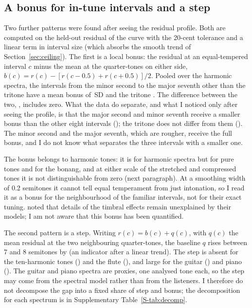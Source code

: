 \documentclass[11pt,a4paper]{article}
\newcommand{\SDu}{\,SD}
\begin{document}
\subsection{A bonus for in-tune intervals and a step}
\label{sec:bonusstep}
Two further patterns were found after seeing the residual profile. Both are computed on the
held-out residual of the curve with the 20-cent tolerance and a linear term in interval size
(which absorbs the smooth trend of Section~\ref{sec:ceiling}). The first is a local bonus: the
residual at an equal-tempered interval $c$ minus the mean at the quarter-tones on either side,
$b(c)=r(c)-[r(c-0.5)+r(c+0.5)]/2$. Pooled over the harmonic spectra, the intervals from the
minor second to the major seventh other than the tritone have a mean bonus of
\decTwoBonusOther\SDu{} and the tritone \decTwoBonusTT. The difference between the two,
\decTwoOtherMinusTT, includes zero. What the data do separate, and what I noticed only after
seeing the profile, is that the major second and minor seventh receive a smaller bonus than
the other eight intervals (\decTwoMMvsRest); the tritone does not differ from them
(\decTwoTTvsMM). The minor second and the major seventh, which are rougher, receive the
full bonus, and I do not know what separates the three intervals with a smaller one.

The bonus belongs to harmonic tones: it is \gbSharpHarmOther{} for harmonic spectra but
\gbSharpPure{} for pure tones and \gbSharpBonang{} for the bonang, and at either scale of the
stretched and compressed tones it is not distinguishable from zero (next paragraph). At a
smoothing width of 0.2 semitones it cannot tell equal temperament from just intonation, so I
read it as a bonus for the neighbourhood of the familiar intervals, not for their exact
tuning. \citet{marjieh2024} noted that details of the timbral effects remain unexplained by
their models; I am not aware that this bonus has been quantified.

The second pattern is a step. Writing $r(c)=b(c)+q(c)$, with $q(c)$ the mean residual at the
two neighbouring quarter-tones, the baseline $q$ rises between 7 and 8 semitones by
\decTwoStep{} (an indicator after a linear trend). The step is absent for the ten-harmonic
tones (\decTwoStepHarm) and the flute (\decTwoStepFlute), and large for the guitar
(\decTwoStepGuitar) and piano (\decTwoStepPiano). The guitar and piano spectra are proxies,
one analysed tone each, so the step may come from the spectral model rather than from the
listeners. I therefore do not decompose the gap into a fixed share of step and bonus; the
decomposition for each spectrum is in Supplementary Table~\ref{S-tab:decomp}.
\end{document}
